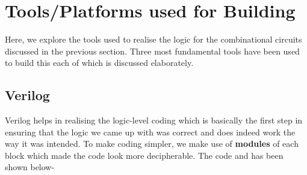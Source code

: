 \documentclass[a4paper, titlepage]{article}
\begin{document}
\section{Tools/Platforms used for Building}
Here, we explore the tools used to realise the logic for the combinational circuits discussed in the previous section.
Three most fundamental tools have been used to build this each of which is discussed elaborately.
\subsection{Verilog}
Verilog helps in realising the logic-level coding which is basically the first step in ensuring that the logic we came up with 
was correct and does indeed work the way it was intended. To make coding simpler, we make use of \textbf{modules} of each block 
which made the code look more decipherable. The code and has been shown below-
\end{document}
